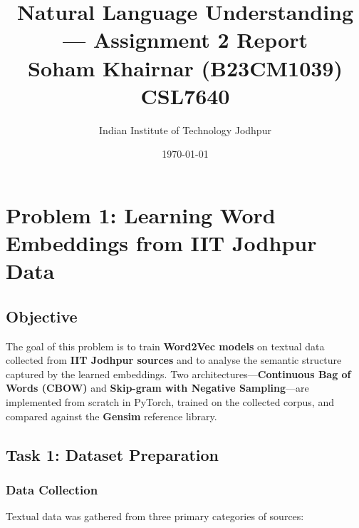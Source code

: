 \documentclass[12pt, a4paper]{article}
\title{
  \vspace{-1cm}
  \textbf{Natural Language Understanding --- Assignment 2 Report} \\[0.3cm]
  \large Soham Khairnar (B23CM1039) \\
  \large CSL7640
}
\author{
  Indian Institute of Technology Jodhpur
}
\date{\today}
\begin{document}
\maketitle
\thispagestyle{fancy}

\tableofcontents
\newpage

\section{Problem 1: Learning Word Embeddings from IIT Jodhpur Data}

\subsection{Objective}

The goal of this problem is to train \textbf{Word2Vec models} on textual data collected from \textbf{IIT Jodhpur sources} and to analyse the semantic structure captured by the learned embeddings. Two architectures---\textbf{Continuous Bag of Words (CBOW)} and \textbf{Skip-gram with Negative Sampling}---are implemented from scratch in PyTorch, trained on the collected corpus, and compared against the \textbf{Gensim} reference library.

\subsection{Task 1: Dataset Preparation}

\subsubsection{Data Collection}

Textual data was gathered from three primary categories of sources:
\end{document}
